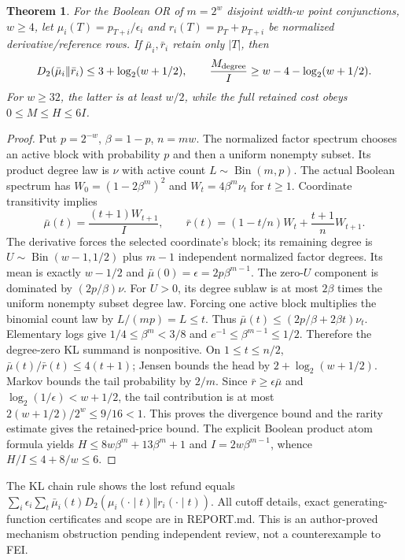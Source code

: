 \documentclass{article}
\newtheorem{theorem}{Theorem}
\begin{document}
\begin{theorem}
For the Boolean OR of $m=2^w$ disjoint width-$w$ point conjunctions, $w\ge4$, let $\mu_i(T)=p_{T+i}/\epsilon_i$ and $r_i(T)=p_T+p_{T+i}$ be normalized derivative/reference rows. If $\bar\mu_i,\bar r_i$ retain only $|T|$, then
\[
D_2(\bar\mu_i\Vert\bar r_i)\le3+\log_2(w+1/2),\qquad
\frac{M_{\rm degree}}I\ge w-4-\log_2(w+1/2).
\]
For $w\ge32$, the latter is at least $w/2$, while the full retained cost obeys $0\le M\le H\le6I$.
\end{theorem}
\begin{proof}
Put $p=2^{-w}$, $\beta=1-p$, $n=mw$. The normalized factor spectrum chooses an active block with probability $p$ and then a uniform nonempty subset. Its product degree law is $\nu$ with active count $L\sim\operatorname{Bin}(m,p)$. The actual Boolean spectrum has $W_0=(1-2\beta^m)^2$ and $W_t=4\beta^m\nu_t$ for $t\ge1$. Coordinate transitivity implies
\[
\bar\mu(t)=\frac{(t+1)W_{t+1}}I,\qquad
\bar r(t)=(1-t/n)W_t+\frac{t+1}{n}W_{t+1}.
\]
The derivative forces the selected coordinate's block; its remaining degree is $U\sim\operatorname{Bin}(w-1,1/2)$ plus $m-1$ independent normalized factor degrees. Its mean is exactly $w-1/2$ and $\bar\mu(0)=\epsilon=2p\beta^{m-1}$.
The zero-$U$ component is dominated by $(2p/\beta)\nu$. For $U>0$, its degree sublaw is at most $2\beta$ times the uniform nonempty subset degree law. Forcing one active block multiplies the binomial count law by $L/(mp)=L\le t$. Thus $\bar\mu(t)\le(2p/\beta+2\beta t)\nu_t$.
Elementary logs give $1/4\le\beta^m<3/8$ and $e^{-1}\le\beta^{m-1}\le1/2$. Therefore the degree-zero KL summand is nonpositive. On $1\le t\le n/2$, $\bar\mu(t)/\bar r(t)\le4(t+1)$; Jensen bounds the head by $2+\log_2(w+1/2)$. Markov bounds the tail probability by $2/m$. Since $\bar r\ge\epsilon\bar\mu$ and $\log_2(1/\epsilon)<w+1/2$, the tail contribution is at most $2(w+1/2)/2^w\le9/16<1$.
This proves the divergence bound and the rarity estimate gives the retained-price bound. The explicit Boolean product atom formula yields $H\le8w\beta^m+13\beta^m+1$ and $I=2w\beta^{m-1}$, whence $H/I\le4+8/w\le6$.
\end{proof}
The KL chain rule shows the lost refund equals $\sum_i\epsilon_i\sum_t\bar\mu_i(t)D_2(\mu_i(\cdot\mid t)\Vert r_i(\cdot\mid t))$. All cutoff details, exact generating-function certificates and scope are in REPORT.md. This is an author-proved mechanism obstruction pending independent review, not a counterexample to FEI.
\end{document}
